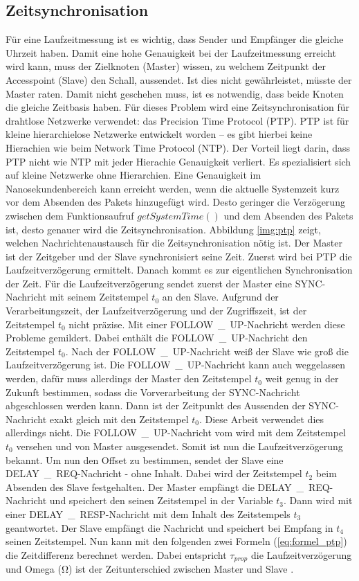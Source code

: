 \subsection{Zeitsynchronisation}
Für eine Laufzeitmessung ist es wichtig, dass Sender und Empfänger die gleiche Uhrzeit haben. Damit eine hohe Genauigkeit bei der Laufzeitmessung erreicht wird kann, muss der Zielknoten (Master) wissen, zu welchem Zeitpunkt der Accesspoint (Slave) den Schall, aussendet. Ist dies nicht gewährleistet, müsste der Master raten. Damit nicht geschehen muss, ist es notwendig, dass beide Knoten die gleiche Zeitbasis haben. Für dieses Problem wird eine Zeitsynchronisation für drahtlose Netzwerke verwendet: das Precision Time Protocol (PTP). PTP ist für kleine hierarchielose Netzwerke entwickelt worden -- es gibt hierbei keine Hierachien wie beim Network Time Protocol (NTP). Der Vorteil liegt darin, dass PTP nicht wie NTP mit jeder Hierachie Genauigkeit verliert. Es spezialisiert sich auf kleine Netzwerke ohne Hierarchien. Eine Genauigkeit im Nanosekundenbereich kann erreicht werden, wenn die aktuelle Systemzeit kurz vor dem Absenden des Pakets hinzugefügt wird. Desto geringer die Verzögerung zwischen dem Funktionsaufruf $getSystemTime()$ und dem Absenden des Pakets ist, desto genauer wird die Zeitsynchronisation. Abbildung \ref{img:ptp} zeigt, welchen Nachrichtenaustausch für die Zeitsynchronisation nötig ist. Der Master ist der Zeitgeber und der Slave synchronisiert seine Zeit. 
Zuerst wird bei PTP die Laufzeitverzögerung ermittelt. Danach kommt es zur eigentlichen Synchronisation der Zeit. Für die Laufzeitverzögerung sendet zuerst der Master eine \si{SYNC}-Nachricht mit seinem Zeitstempel $t_{0}$ an den Slave. Aufgrund der Verarbeitungszeit, der Laufzeitverzögerung und der Zugriffszeit, ist der Zeitstempel $t_{0}$ nicht präzise. Mit einer \si{FOLLOW\_UP}-Nachricht werden diese Probleme gemildert. Dabei enthält die \si{FOLLOW\_UP}-Nachricht den Zeitstempel $t_{0}$. Nach der \si{FOLLOW\_UP}-Nachricht weiß der Slave wie groß die Laufzeitverzögerung ist. Die \si{FOLLOW\_UP}-Nachricht kann auch weggelassen werden, dafür muss allerdings der Master den Zeitstempel $t_{0}$ weit genug in der Zukunft bestimmen, sodass die Vorverarbeitung der \si{SYNC}-Nachricht abgeschlossen werden kann. Dann ist der Zeitpunkt des Aussenden der \si{SYNC}-Nachricht exakt gleich mit den Zeitstempel $t_{0}$. Diese Arbeit verwendet dies allerdings nicht. Die \si{FOLLOW\_UP}-Nachricht vom wird mit dem Zeitstempel $t_{0}$ versehen und von Master ausgesendet. Somit ist nun die Laufzeitverzögerung bekannt.
Um nun den Offset zu bestimmen, sendet der Slave eine \si{DELAY\_REQ}-Nachricht - ohne Inhalt. Dabei wird der Zeitstempel $t_{2}$ beim Absenden des Slave festgehalten. Der Master empfängt die \si{DELAY\_REQ}-Nachricht und speichert den seinen Zeitstempel in der Variable $t_{3}$. Dann wird mit einer \si{DELAY\_RESP}-Nachricht mit dem Inhalt des Zeitstempels $t_{3}$ geantwortet. Der Slave empfängt die Nachricht und speichert bei Empfang in $t_{4}$ seinen Zeitstempel. Nun kann mit den folgenden zwei Formeln (\ref{eq:formel_ptp}) die Zeitdifferenz berechnet werden. Dabei entspricht $\tau_{prop}$ die Laufzeitverzögerung und Omega (\si{\ohm}) ist der Zeitunterschied zwischen Master und Slave \cite{src_PTP}.

